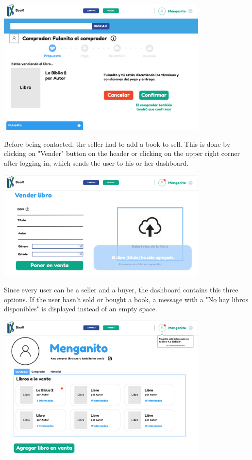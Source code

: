 \begin{center}
    \includegraphics[width=300pt]{img/mockups/Huascar Retrieval Team - Vendedor siendo contactado (1).jpg}
\end{center}

Before being contacted, the seller had to add a book to sell. This is done by clicking on "Vender" button on the header or clicking on the upper right corner after logging in, which sends the user to his or her dashboard.

\begin{center}
    \includegraphics[width=300pt]{img/mockups/Huascar Retrieval Team - Copy of Dashboard.jpg}
\end{center}

Since every user can be a seller and a buyer, the dashboard contains this three options. If the user hasn't sold or bought a book, a message with a "No hay libros disponibles" is displayed instead of an empty space.


\begin{center}
    \includegraphics[width=300pt]{img/mockups/Huascar Retrieval Team - Dashboard vendedor.jpg}
    \end{center}
